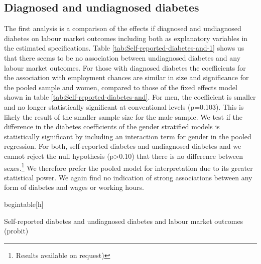 \subsection{Diagnosed and undiagnosed diabetes}

The first analysis is a comparison of the effects if diagnosed and
undiagnosed diabetes on labour market outcomes including both as explanatory
variables in the estimated specifications. Table \ref{tab:Self-reported-diabetes-and-1}
shows us that there seems to be no association between undiagnosed
diabetes and any labour market outcomes. For those with diagnosed
diabetes the coefficients for the association with employment chances
are similar in size and significance for the pooled sample and women,
compared to those of the fixed effects model shown in table \ref{tab:Self-reported-diabetes-and}.
For men, the coefficient is smaller and no longer statistically significant
at conventional levels (p=0.103). This is likely the result of the
smaller sample size for the male sample. We test if the difference
in the diabetes coefficients of the gender stratified models is statistically
significant by including an interaction term for gender in the pooled
regression. For both, self-reported diabetes and undiagnosed diabetes
and we cannot reject the null hypothesis (p>0.10) that there is no
difference between sexes.\footnote{Results available on request)}
We therefore prefer the pooled model for interpretation due to its
greater statistical power. We again find no indication of strong associations
between any form of diabetes and wages or working hours. 

begin{table}[h]
\caption{\label{tab:Self-reported-diabetes-and-1}Self-reported diabetes and
undiagnosed diabetes and labour market outcomes (probit)}


